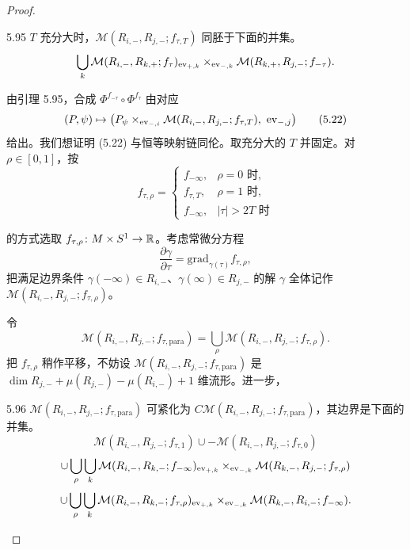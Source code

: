 \begin{proof}
\begin{lemma}{5.95}
  $T$ 充分大时，$\mathcal{M}(R_{i,-},R_{j,-};f_{\tau,T})$ 同胚于下面的并集。
  \[
    \bigcup_k\mathcal{M}(R_{i,-},R_{k,+};f_\tau)_{\operatorname{ev}_{+,k}}
    \times_{\operatorname{ev}_{-,k}}\mathcal{M}(R_{k,+},R_{j,-};f_{-\tau}).
  \]
\end{lemma}

由引理 5.95，合成 $\Phi^{f_{-\tau}}\circ\Phi^{f_\tau}$ 由对应
\begin{equation}
  (P,\psi)\mapsto\bigl(P_\psi\times_{\ev_{-,i}}\mathcal{M}(R_{i,-},R_{j,-};f_{\tau,T}),\ \ev_{-,j}\bigr) \tag{5.22}
\end{equation}
给出。我们想证明 (5.22) 与恒等映射链同伦。取充分大的 $T$ 并固定。对 $\rho\in[0,1]$，按
\begin{equation}
  f_{\tau,\rho}=
  \begin{cases}
    f_{-\infty}, & \rho=0\text{ 时},\\
    f_{\tau,T}, & \rho=1\text{ 时},\\
    f_{-\infty}, & |\tau|>2T\text{ 时}
  \end{cases}
  \tag{5.23}
\end{equation}

的方式选取 $f_{\tau,\rho}\colon M\times S^1\to\mathbb{R}$。考虑常微分方程
\[
\frac{\partial\gamma}{\partial\tau}=\mathrm{grad}_{\gamma(\tau)}f_{\tau,\rho},
\]
把满足边界条件 $\gamma(-\infty)\in R_{i,-}$、$\gamma(\infty)\in R_{j,-}$ 的解 $\gamma$ 全体记作 $\mathcal{M}(R_{i,-},R_{j,-};f_{\tau,\rho})$。

令
\[
\mathcal{M}(R_{i,-},R_{j,-};f_{\tau,\mathrm{para}})=\bigcup_\rho\mathcal{M}(R_{i,-},R_{j,-};f_{\tau,\rho}).
\]
把 $f_{\tau,\rho}$ 稍作平移，不妨设 $\mathcal{M}(R_{i,-},R_{j,-};f_{\tau,\mathrm{para}})$ 是 $\dim R_{j,-}+\mu(R_{j,-})-\mu(R_{i,-})+1$ 维流形。进一步，

\begin{lemma}{5.96}
  $\mathcal{M}(R_{i,-},R_{j,-};f_{\tau,\mathrm{para}})$ 可紧化为 $C\mathcal{M}(R_{i,-},R_{j,-};f_{\tau,\mathrm{para}})$，其边界是下面的并集。
  \[
    \mathcal{M}(R_{i,-},R_{j,-};f_{\tau,1})\cup-\mathcal{M}(R_{i,-},R_{j,-};f_{\tau,0})
  \]
  \[
    \cup\bigcup_\rho\bigcup_k\mathcal{M}(R_{i,-},R_{k,-};f_{-\infty})_{\operatorname{ev}_{+,k}}
    \times_{\operatorname{ev}_{-,k}}\mathcal{M}(R_{k,-},R_{j,-};f_{\tau,\rho})
  \]
  \[
    \cup\bigcup_\rho\bigcup_k\mathcal{M}(R_{i,-},R_{k,-};f_{\tau,\rho})_{\operatorname{ev}_{+,k}}
    \times_{\operatorname{ev}_{-,k}}\mathcal{M}(R_{k,-},R_{i,-};f_{-\infty}).
  \]
\end{lemma}


\end{proof}

